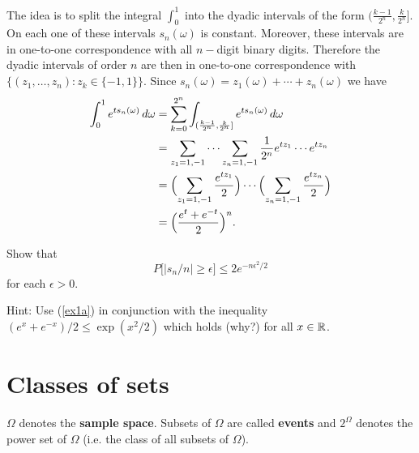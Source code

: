 \begin{exerciseproof}
The idea is to split the integral $\int_0^1$ into the dyadic intervals of the form $(\frac{k-1}{2^n},\frac{k}{2^n} ]$. On each one of these intervals $s_n(\omega)$ is constant. Moreover, these intervals are in one-to-one correspondence with all $n-$digit binary digits. Therefore the dyadic intervals of order $n$ are then in one-to-one correspondence with $\{(z_1,\ldots, z_n)\colon z_k\in\{ -1,1\} \}$. Since $s_n(\omega) = z_1(\omega)+\cdots+ z_n(\omega) $ we have
\begin{align*}
\int_0^1 e^{ts_n(\omega)}\,d\omega
& = \sum_{k=0}^{2^n}\int_{(\frac{k-1}{2^n},\frac{k}{2^n} ]} e^{ts_n(\omega)}\,d\omega \\
& = \sum_{z_1=1,-1}\cdots  \sum_{z_n=1,-1}\frac{1}{2^n} e^{tz_1} \cdots e^{tz_n} \\
& = \Bigl(\sum_{z_1=1,-1}\frac{e^{tz_1}}{2}\Bigr)\cdots  \Bigl(\sum_{z_n=1,-1}\frac{e^{tz_n}}{2}\Bigr)\\
& = \Bigl(\frac{e^t+e^{-t}}{2} \Bigr)^n .
\end{align*}
\end{exerciseproof}



\begin{exercise}
\label{exp ineq for sn}
 Show that
\[P\bigl[|s_n/n|\geq \epsilon\bigr]\leq 2 e^{-n\epsilon^2/2}  \]
for each $\epsilon>0$.

 Hint: %
 Use (\ref{ex1a}) in conjunction with the inequality $(e^x + e^{-x})/2\leq \exp(x^2/2)$ which holds (why?) for all $x\in\Bbb R$.
\end{exercise}


\clearpage
\section{Classes of sets}


\begin{definition}
$\Omega$ denotes the {\bf sample space}. Subsets of $\Omega$ are called {\bf events} and $2^\Omega$ denotes the power set of $\Omega$ (i.e. the class of all subsets of $\Omega$).
\end{definition}


